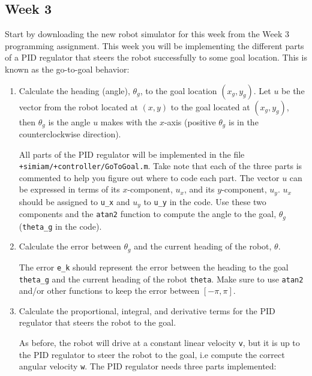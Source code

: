 \documentclass[10pt]{article}
\begin{document}
\newpage
\subsection{Week 3}

Start by downloading the new robot simulator for this week from the {Week 3 programming assignment}. This week you will be implementing the different parts of a PID regulator that steers the robot successfully to some goal location. This is known as the go-to-goal behavior:

\begin{enumerate}
 \item Calculate the heading (angle), $\theta_g$, to the goal location $(x_g,y_g)$. Let $u$ be the vector from the robot located at $(x,y)$ to the goal located at $(x_g,y_g)$, then $\theta_g$ is the angle $u$ makes with the $x$-axis (positive $\theta_g$ is in the counterclockwise direction).

All parts of the PID regulator will be implemented in the file \texttt{+simiam/+controller/GoToGoal.m}. Take note that each of the three parts is commented to help you figure out where to code each part. The vector $u$ can be expressed in terms of its $x$-component, $u_x$, and its $y$-component, $u_y$. $u_x$ should be assigned to \texttt{u\_x} and $u_y$ to \texttt{u\_y} in the code. Use these two components and the \texttt{atan2} function to compute the angle to the goal, $\theta_g$ (\texttt{theta\_g} in the code).


 \item Calculate the error between $\theta_g$ and the current heading of the robot, $\theta$.
 
 The error \texttt{e\_k} should represent the error between the heading to the goal \texttt{theta\_g} and the current heading of the robot \texttt{theta}. Make sure to use \texttt{atan2} and/or other functions to keep the error between $[-\pi,\pi]$.
 
 \item Calculate the proportional, integral, and derivative terms for the PID regulator that steers the robot to the goal.
 
 As before, the robot will drive at a constant linear velocity \texttt{v}, but it is up to the PID regulator to steer the robot to the goal, i.e compute the correct angular velocity \texttt{w}. The PID regulator needs three parts implemented:
 

\end{enumerate}
\end{document}
